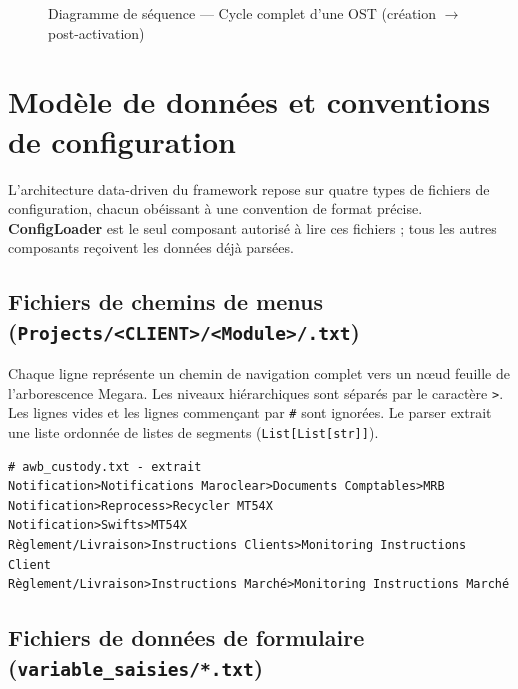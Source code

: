 \documentclass[12pt, a4paper]{report}
\begin{document}
\begin{figure}[H]
\begin{tikzpicture}[>=Stealth, font=\scriptsize, thick,
  hd/.style={draw=nexusBlue, fill=nexusBlue!10, minimum width=2.6cm,
             minimum height=0.5cm, align=center, font=\scriptsize}]
\end{tikzpicture}
\caption{Diagramme de séquence — Cycle complet d'une OST (création $\to$ post-activation)}
\label{fig:seq_ost}
\end{figure}

\section{Modèle de données et conventions de configuration}

L'architecture data-driven du framework repose sur quatre types de fichiers de configuration, chacun obéissant à une convention de format précise. \textbf{ConfigLoader} est le seul composant autorisé à lire ces fichiers ; tous les autres composants reçoivent les données déjà parsées.

\subsection[Fichiers de chemins de menus]%
  {Fichiers de chemins de menus (\texttt{Projects/<CLIENT>/\allowbreak<Module>/\allowbreak*.txt})}

Chaque ligne représente un chemin de navigation complet vers un nœud feuille de l'arborescence Megara. Les niveaux hiérarchiques sont séparés par le caractère \og{}\texttt{>}\fg{}. Les lignes vides et les lignes commençant par \texttt{\#} sont ignorées. Le parser extrait une liste ordonnée de listes de segments (\texttt{List[List[str]]}).

\begin{mdframed}[backgroundcolor=codeGray, linewidth=0pt, innerleftmargin=8pt]
\begin{verbatim}
# awb_custody.txt - extrait
Notification>Notifications Maroclear>Documents Comptables>MRB
Notification>Reprocess>Recycler MT54X
Notification>Swifts>MT54X
Règlement/Livraison>Instructions Clients>Monitoring Instructions Client
Règlement/Livraison>Instructions Marché>Monitoring Instructions Marché
\end{verbatim}
\end{mdframed}

\subsection{Fichiers de données de formulaire (\texttt{variable\_saisies/*.txt})}
\end{document}
